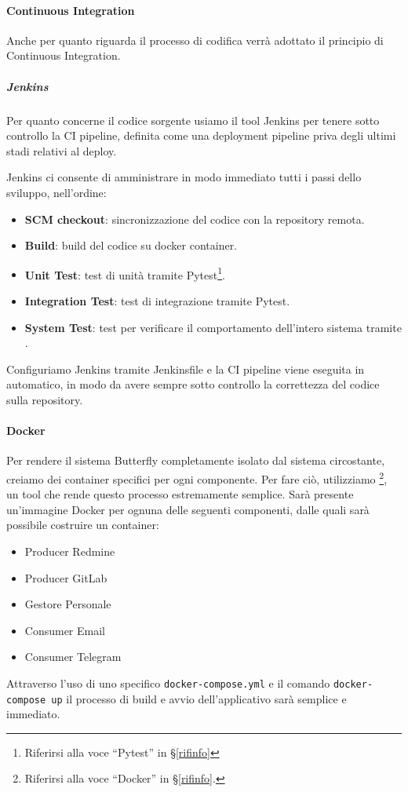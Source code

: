 			\paragraph{Continuous Integration}\label{CI}
			Anche per quanto riguarda il processo di codifica verrà adottato il principio di Continuous Integration.

			\subparagraph{Jenkins}\label{Jenkins}
			Per quanto concerne il codice sorgente usiamo il tool Jenkins per tenere sotto controllo la CI pipeline, definita come una deployment pipeline priva degli ultimi stadi relativi al deploy.\par
			Jenkins ci consente di amministrare in modo immediato tutti i passi dello sviluppo, nell'ordine:
			\begin{itemize}
				\item \textbf{SCM checkout}: sincronizzazione del codice con la repository remota.
				\item \textbf{Build}: build del codice su docker container.
				\item \textbf{Unit Test}: test di unità tramite Pytest\footnote{Riferirsi alla voce ``Pytest'' in \S\ref{rifinfo}}.
				\item \textbf{Integration Test}: test di integrazione tramite Pytest.
				\item \textbf{System Test}: test per verificare il comportamento dell'intero sistema tramite .
			\end{itemize}

			Configuriamo Jenkins tramite Jenkinsfile e la CI pipeline viene eseguita in automatico, in modo da avere sempre sotto controllo la correttezza del codice sulla repository.

			\paragraph{Docker}\label{Docker} %
			Per rendere il sistema Butterfly completamente isolato dal sistema circostante, creiamo dei container specifici per ogni componente. Per fare ciò, utilizziamo
			\footnote{Riferirsi alla voce ``Docker'' in \S\ref{rifinfo}.},
			un tool che rende questo processo estremamente semplice. Sarà presente un'immagine Docker per ognuna delle seguenti componenti, dalle quali sarà possibile costruire un container:
			\begin{itemize}
				\item Producer Redmine
				\item Producer GitLab
				\item Gestore Personale
				\item Consumer Email
				\item Consumer Telegram
			\end{itemize}
			Attraverso l'uso di uno specifico \texttt{docker-compose.yml} e il comando \texttt{docker-compose up} il processo di build e avvio dell'applicativo sarà semplice e immediato.

